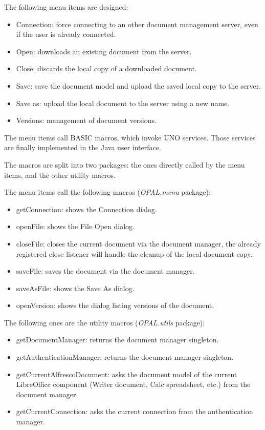 The following menu items are designed:

\begin{itemize}
\item Connection: force connecting to an other document management server, even
if the user is already connected.
\item Open: downloads an existing document from the server.
\item Close: discards the local copy of a downloaded document.
\item Save: save the document model and upload the saved local copy to the server.
\item Save as: upload the local document to the server using a new name.
\item Versions: management of document versions.
\end{itemize}

The menu items call BASIC macros, which invoke UNO services. Those services are
finally implemented in the Java user interface.

The macros are split into two packages: the ones directly called by the menu
items, and the other utility macros.

The menu items call the following macros (\emph{OPAL.menu} package):

\begin{itemize}
\item getConnection: shows the Connection dialog.
\item openFile: shows the File Open dialog.
\item closeFile: closes the current document via the document manager, the
already registered close listener will handle the cleanup of the local document
copy.
\item saveFile: saves the document via the document manager.
\item saveAsFile: shows the Save As dialog.
\item openVersion: shows the dialog listing versions of the document.
\end{itemize}

The following ones are the utility macros (\emph{OPAL.utils} package):

\begin{itemize}
\item getDocumentManager: returns the document manager singleton.
\item getAuthenticationManager: returns the document manager singleton.
\item getCurrentAlfrescoDocument: asks the document model of the current LibreOffice component (Writer document, Calc spreadsheet, etc.) from the document manager.
\item getCurrentConnection: asks the current connection from the authentication manager.
\end{itemize}

